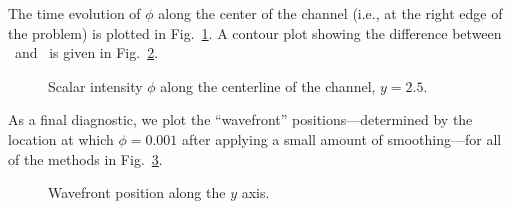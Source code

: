 The time evolution of $\phi$ along the center of the channel (i.e., at the
right edge of the problem) is plotted in Fig.~\ref{fig:tdReactor}. A contour
plot showing the difference between \Pone\ and \APone\ is given in
Fig.~\ref{fig:tdReactorContour}.

\begin{figure}[htb]
  \centering\small
  \subfloat[$t=2$]{%
    }%
  \subfloat[$t=5$]{%
    }

  \subfloat[$t=10$]{%
    }%
  \subfloat[$t=15$]{%
    }

  \caption{Scalar intensity $\phi$ along the centerline of the channel, $y=2.5$.}
  \label{fig:tdReactor}
\end{figure}

\begin{figure}[htb]
  \centering\small


  \label{fig:tdReactorContour}
\end{figure}

As a final diagnostic, we plot the ``wavefront'' positions---determined by the
location at which $\phi=0.001$ after applying a small amount of smoothing---for
all of the methods in Fig.~\ref{fig:tdReactorWavefront}.

\begin{figure}[htb]
  \centering\small
  \subfloat[Channel, $y=2.5$]{%
    }

  \subfloat[Medium, $y=0$]{%
    }

  \caption{Wavefront position along the $y$ axis.}
  \label{fig:tdReactorWavefront}
\end{figure}

\clearpage
